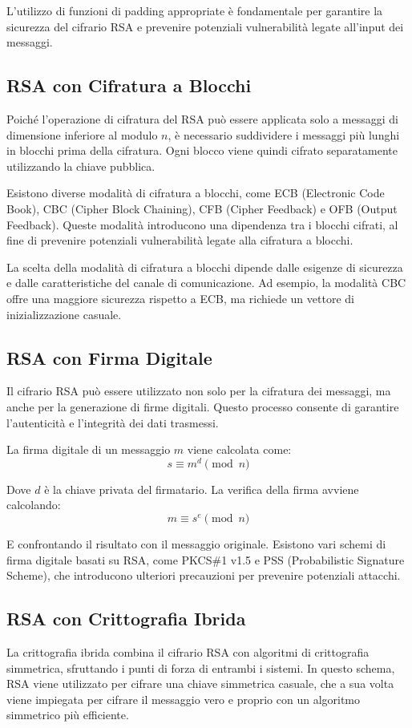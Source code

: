 \documentclass[a4paper,12pt]{report}
\begin{document}
L'utilizzo di funzioni di padding appropriate è fondamentale per garantire la sicurezza del cifrario RSA e prevenire potenziali vulnerabilità legate all'input dei messaggi.

\subsection{RSA con Cifratura a Blocchi}
Poiché l'operazione di cifratura del RSA può essere applicata solo a messaggi di dimensione inferiore al modulo $n$, è necessario suddividere i messaggi più lunghi in blocchi prima della cifratura. Ogni blocco viene quindi cifrato separatamente utilizzando la chiave pubblica.

Esistono diverse modalità di cifratura a blocchi, come ECB (Electronic Code Book), CBC (Cipher Block Chaining), CFB (Cipher Feedback) e OFB (Output Feedback). Queste modalità introducono una dipendenza tra i blocchi cifrati, al fine di prevenire potenziali vulnerabilità legate alla cifratura a blocchi.

La scelta della modalità di cifratura a blocchi dipende dalle esigenze di sicurezza e dalle caratteristiche del canale di comunicazione. Ad esempio, la modalità CBC offre una maggiore sicurezza rispetto a ECB, ma richiede un vettore di inizializzazione casuale.

\subsection{RSA con Firma Digitale}
Il cifrario RSA può essere utilizzato non solo per la cifratura dei messaggi, ma anche per la generazione di firme digitali. Questo processo consente di garantire l'autenticità e l'integrità dei dati trasmessi.

La firma digitale di un messaggio $m$ viene calcolata come:
\[s \equiv m^d \pmod{n}\]

Dove $d$ è la chiave privata del firmatario. La verifica della firma avviene calcolando:
\[m \equiv s^e \pmod{n}\]

E confrontando il risultato con il messaggio originale. Esistono vari schemi di firma digitale basati su RSA, come PKCS\#1 v1.5 e PSS (Probabilistic Signature Scheme), che introducono ulteriori precauzioni per prevenire potenziali attacchi.

\subsection{RSA con Crittografia Ibrida}
La crittografia ibrida combina il cifrario RSA con algoritmi di crittografia simmetrica, sfruttando i punti di forza di entrambi i sistemi. In questo schema, RSA viene utilizzato per cifrare una chiave simmetrica casuale, che a sua volta viene impiegata per cifrare il messaggio vero e proprio con un algoritmo simmetrico più efficiente.
\end{document}
